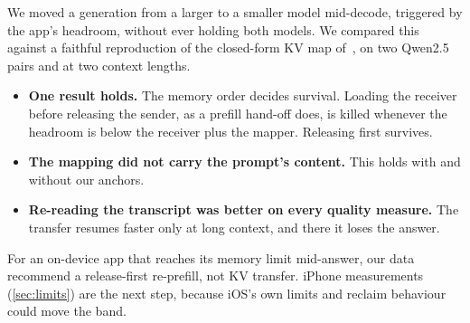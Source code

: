 We moved a generation from a larger to a smaller model mid-decode, triggered by the app's headroom, without ever holding both models.
We compared this against a faithful reproduction of the closed-form KV map of~\citep{heo2026crossmodel}, on two Qwen2.5 pairs and at two context lengths.
\begin{itemize}
\item \textbf{One result holds.} The memory order decides survival. Loading the receiver before releasing the sender, as a prefill hand-off does, is killed whenever the headroom is below the receiver plus the mapper. Releasing first survives.
\item \textbf{The mapping did not carry the prompt's content.} This holds with and without our anchors.
\item \textbf{Re-reading the transcript was better on every quality measure.} The transfer resumes faster only at long context, and there it loses the answer.
\end{itemize}
For an on-device app that reaches its memory limit mid-answer, our data recommend a release-first re-prefill, not KV transfer.
iPhone measurements (\cref{sec:limits}) are the next step, because iOS's own limits and reclaim behaviour could move the band.
